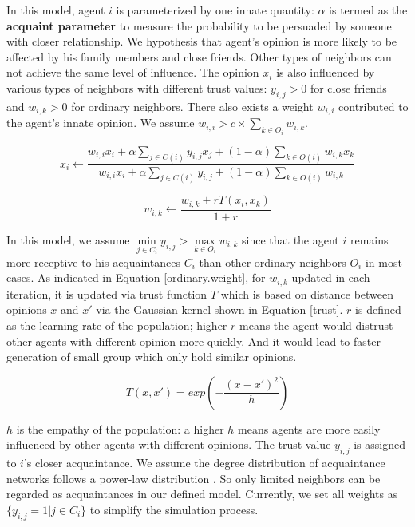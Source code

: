\documentclass[11pt]{article}
\theoremstyle{definition}
\theoremstyle{basic}
\begin{document}
In this model, agent $i$ is parameterized by one innate quantity: $\alpha$ is termed as the \textbf{acquaint parameter} to measure the probability to be persuaded by someone with closer relationship. We hypothesis that agent's opinion is more likely to be affected by his family members and close friends. Other types of neighbors can not achieve the same level of influence.
The opinion $x_i$ is also influenced by various types of neighbors with different trust values: $y_{i,j}>0$ for close friends and $w_{i,k}>0$ for ordinary neighbors. There also exists a weight $w_{i,i}$ contributed to the agent's innate opinion. We assume $w_{i,i}>c\times\sum_{k\in{O_i}}w_{i,k}$.

\begin{equation}
x_i \gets \frac{w_{i,i}x_i + \alpha\sum\limits_{j \in C(i)}y_{i,j}x_j + (1-\alpha)\sum\limits_{k \in O(i)}w_{i,k}x_k}{w_{i,i}x_i + \alpha\sum\limits_{j \in C(i)}y_{i,j} + (1-\alpha)\sum\limits_{k \in O(i)}w_{i,k}}
\end{equation} 

\begin{equation}
w_{i,k} \gets \frac{w_{i,k} + rT(x_i,x_k)}{1+r}
\label{ordinary.weight}
\end{equation}

In this model, we assume $\min\limits_{{j}\in C_i}{y_{i,j}} > \max\limits_{{k}\in O_i}{w_{i,k}}$ since that the agent $i$ remains more receptive to his acquaintances $C_i$ than other ordinary neighbors $O_i$ in most cases. As indicated in Equation \ref{ordinary.weight}, for $w_{i,k}$ updated in each iteration, it is updated via trust function $T$ which is based on distance between opinions $x$ and $x{'}$ via the Gaussian kernel shown in Equation \ref{trust}. $r$ is defined as the learning rate of the population; higher $r$ means the agent would distrust other agents with different opinion more quickly. And it would lead to faster generation of small group which only hold similar opinions.

\begin{equation}
T(x,x{'})=exp(-\frac{(x-x{'})^2}{h})
\label{trust}
\end{equation} 

$h$ is the empathy of the population: a higher $h$ means agents are more easily influenced by other agents with different opinions. The trust value $y_{i,j}$ is assigned to $i$'s closer acquaintance. We assume the degree distribution of acquaintance networks follows a power-law distribution \cite{muchnik2013origins}. So only limited neighbors can be regarded as acquaintances in our defined model. Currently, we set all weights as $\{y_{i,j}=1|j \in C_i\}$ to simplify the simulation process. 
\end{document}
